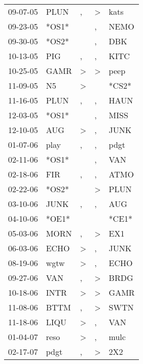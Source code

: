 \begin{supertabular}{lllll}
 09-07-05 &   PLUN &                , &     \textgreater &   kats \\
 09-23-05 &  *OS1* &                  &                , &   NEMO \\
 09-30-05 &  *OS2* &                  &                , &    DBK \\
 10-13-05 &    PIG &                , &                , &   KITC \\
 10-25-05 &   GAMR &     \textgreater &     \textgreater &   peep \\
 11-09-05 &     N5 &     \textgreater &                  &  *CS2* \\
 11-16-05 &   PLUN &                , &                , &   HAUN \\
 12-03-05 &  *OS1* &                  &                , &   MISS \\
 12-10-05 &    AUG &     \textgreater &                , &   JUNK \\
 01-07-06 &   play &                , &                , &   pdgt \\
 02-11-06 &  *OS1* &                  &                , &    VAN \\
 02-18-06 &    FIR &                , &                , &   ATMO \\
 02-22-06 &  *OS2* &                  &     \textgreater &   PLUN \\
 03-10-06 &   JUNK &                , &                , &    AUG \\
 04-10-06 &  *OE1* &                  &                  &  *CE1* \\
 05-03-06 &   MORN &                , &     \textgreater &    EX1 \\
 06-03-06 &   ECHO &     \textgreater &                , &   JUNK \\
 08-19-06 &   wgtw &     \textgreater &                , &   ECHO \\
 09-27-06 &    VAN &                , &     \textgreater &   BRDG \\
 10-18-06 &   INTR &     \textgreater &     \textgreater &   GAMR \\
 11-08-06 &   BTTM &                , &     \textgreater &   SWTN \\
 11-18-06 &   LIQU &     \textgreater &                , &    VAN \\
 01-04-07 &   reso &     \textgreater &                , &   mulc \\
 02-17-07 &   pdgt &                , &     \textgreater &    2X2 \\

\end{supertabular}
